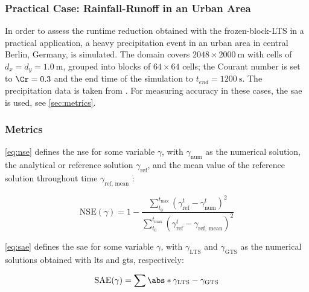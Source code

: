 \subsubsection{Practical Case: Rainfall-Runoff in an Urban Area} \label{sec:case-moabit}
In order to assess the runtime reduction obtained with the \gls{frozen-block-LTS} in a practical application, a heavy precipitation event in an urban area in central Berlin, Germany, is simulated.
The domain covers $2048 \times \SI{2000}{\meter}$ with cells of $d_x = d_y = \SI{1.0}{\meter}$, grouped into blocks of $64 \times 64$ cells; 
the Courant number is set to $\Cr = 0.3$ and the end time of the simulation to $t_{end} = \SI{1200}{\second}$.
The precipitation data is taken from \textcite{fischer2024}.
For measuring accuracy in these cases, the \gls{sae} is used, see \autoref{sec:metrics}.

\subsubsection{Metrics} \label{sec:metrics}

\autoref{eq:nse} defines the \gls{nse} for some variable $\gamma$, with $\gamma_{\text{num}}$ as the numerical solution, 
the analytical or reference solution $\gamma_{\text{ref}}$,
and the mean value of the reference solution throughout time $\gamma_{\text{ref, mean}}$ \autocite{nash1970}:

\begin{equation}
  \label{eq:nse}
  \mathrm{NSE}(\gamma) = 1 - \frac{
      \sum_{t_0}^{t_{\max}} \left( \gamma^t_{\text{ref}} -\gamma^t_{\text{num}} \right)^2
    }{
      \sum_{t_0}^{t_{\max}} \left( \gamma^t_{\text{ref}} -\gamma_{\text{ref, mean}} \right)^2
    }
\end{equation}

\autoref{eq:sae} defines the \gls{sae} for some variable $\gamma$, with $\gamma_{\text{LTS}}$ and $\gamma_{\text{GTS}}$ as the numerical solutions obtained with \gls{lts} and \gls{gts}, respectively:

\begin{equation}
  \label{eq:sae}
  \mathrm{SAE}(\gamma) = \sum \abs*{\gamma_{\text{LTS}} - \gamma_{\text{GTS}}}
\end{equation}